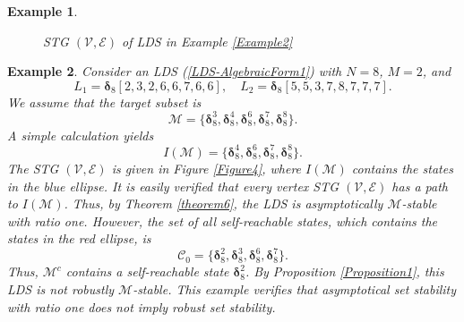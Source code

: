 \documentclass[11pt,onecolumn]{article}
\newtheorem{example}{Example}
\newcommand{\ddelta}{{\boldsymbol\delta}}
\begin{document}
\begin{example}
\begin{figure}[t]



\caption{STG $(\mathcal V,\mathcal E)$ of LDS in Example \ref{Example2}}
\label{Figure3}
\end{figure}


\end{example}



\begin{example}\label{Example3}
     Consider an LDS (\ref{LDS-AlgebraicForm1}) with $N = 8$, $M = 2$, and
    \[L_1=\ddelta_8[2,3,2,6,6,7,6,6],\quad L_2=\ddelta_8[5,5,3,7,8,7,7,7].\]
    We assume that the target subset is
   \[\mathcal M=\{\ddelta_8^3,\ddelta_8^4,\ddelta_8^6,\ddelta_8^7,\ddelta_8^8\}. \]
   A simple calculation yields
   \[I(\mathcal M)=\{\ddelta_8^4, \ddelta_8^6,\ddelta_8^7,\ddelta_8^8\}.\]
   The STG $(\mathcal V,\mathcal E)$ is given in Figure \ref{Figure4}, where $I(\mathcal M)$ contains the states in the blue ellipse. It is easily verified  that every vertex STG $(\mathcal V,\mathcal E)$ has a path to $I(\mathcal M)$. Thus, by Theorem \ref{theorem6}, the LDS is asymptotically $\mathcal M$-stable with ratio one. However,  the set of all self-reachable states, which contains the states in the red ellipse, is
 \[\mathcal C_0=\{\ddelta_8^2,\ddelta_8^3,\ddelta_8^6,\ddelta_8^7\}.\]
 Thus, $\mathcal M^c$ contains a self-reachable state $\ddelta_8^2$. By Proposition \ref{Proposition1}, this LDS is not robustly $\mathcal M$-stable. This example verifies that asymptotical set stability with ratio one does not imply robust set stability.


\end{example}
\end{document}
